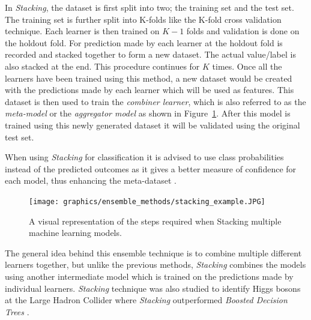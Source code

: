 In \textit{Stacking}, the dataset is first split into two; the training set and the test set. The training set is further split into K-folds like the K-fold cross validation technique. Each learner is then trained on $K-1$ folds and validation is done on the holdout fold. For prediction made by each learner at the holdout fold is recorded and stacked together to form a new dataset. The actual value/label is also stacked at the end. This procedure continues for $K$ times. Once all the learners have been trained using this method, a new dataset would be created with the predictions made by each learner which will be used as features. This dataset is then used to train the \textit{combiner learner}, which is also referred to as the \textit{meta-model} or the \textit{aggregator model} as shown in Figure~\ref{fig:stackingexample}. After this model is trained using this newly generated dataset it will be validated using the original test set. 

When using \textit{Stacking} for classification it is advised to use class probabilities instead of the predicted outcomes as it gives a better measure of confidence for each model, thus enhancing the meta-dataset \citep{ting1999issues}. 

\begin{figure}
  \texttt{[image: graphics/ensemble\_methods/stacking\_example.JPG]}
  \caption{
     A visual representation of the steps required when Stacking multiple machine learning models.
  }
  \label{fig:stackingexample}
\end{figure}

The general idea behind this ensemble technique is to combine multiple different learners together, but unlike the previous methods, \textit{Stacking} combines the models using another intermediate model which is trained on the predictions made by individual learners. \textit{Stacking} technique was also studied to identify Higgs bosons at the Large Hadron Collider where \textit{Stacking} outperformed \textit{Boosted Decision Trees} \citep{alves2017stacking}.  

